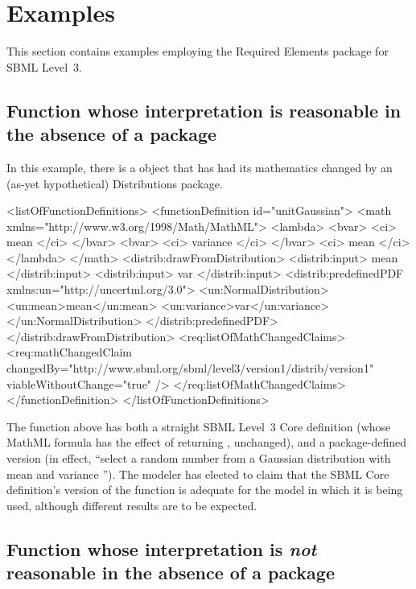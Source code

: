 
\section{Examples}
\label{examples}

This section contains examples employing the Required Elements package for SBML Level~3.

\subsection{Function whose interpretation is reasonable in the absence of a package}

In this example, there is a \FunctionDefinition object that has had its mathematics changed by an (as-yet hypothetical) Distributions package.

\begin{example}
<listOfFunctionDefinitions> 
  <functionDefinition id="unitGaussian"> 
    <math xmlns="http://www.w3.org/1998/Math/MathML"> 
      <lambda>
        <bvar>
          <ci> mean </ci>
        </bvar>
        <bvar>
          <ci> variance </ci>
        </bvar>
        <ci> mean </ci>
      </lambda>
    </math> 
    <distrib:drawFromDistribution>
      <distrib:input> mean </distrib:input>
      <distrib:input> var </distrib:input>
      <distrib:predefinedPDF xmlns:un="http://uncertml.org/3.0">
        <un:NormalDistribution>
           <un:mean>mean</un:mean>
           <un:variance>var</un:variance>
         </un:NormalDistribution>
      </distrib:predefinedPDF>
    </distrib:drawFromDistribution>
    <req:listOfMathChangedClaims>
      <req:mathChangedClaim changedBy="http://www.sbml.org/sbml/level3/version1/distrib/version1"
                            viableWithoutChange="true" />
    </req:listOfMathChangedClaims>
  </functionDefinition> 
</listOfFunctionDefinitions> 
\end{example}

The function  above has both a straight SBML Level~3 Core definition (whose MathML formula has the effect of returning , unchanged), and a package-defined version (in effect, ``select a random number from a Gaussian distribution with mean  and variance ''). The modeler has elected to claim that the SBML Core definition's version of the function is adequate for the model in which it is being used, although different results are to be expected.


\subsection{Function whose interpretation is \emph{not} reasonable in the absence of a package}


